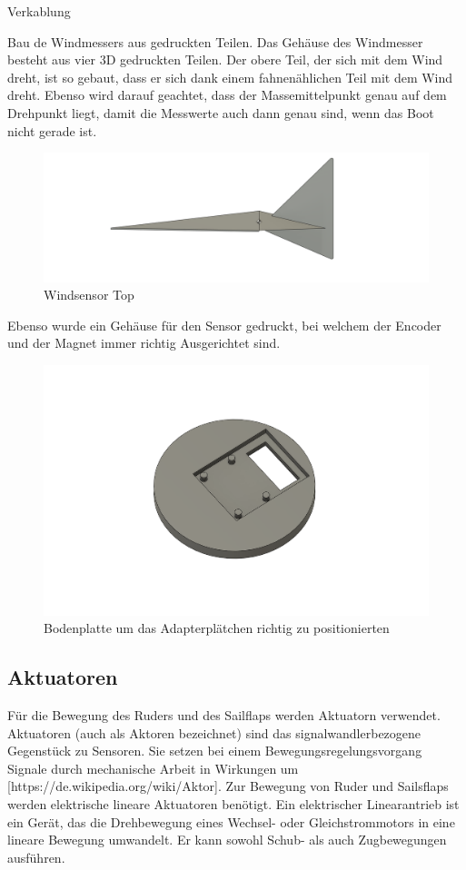 Verkablung

Bau de Windmessers aus gedruckten Teilen. 
Das Gehäuse des Windmesser besteht aus vier 3D gedruckten Teilen. Der obere Teil, der sich mit dem Wind dreht, ist so gebaut, dass er sich dank einem fahnenählichen Teil mit dem Wind dreht. Ebenso wird darauf geachtet, dass der Massemittelpunkt genau auf dem Drehpunkt liegt, damit die Messwerte auch dann genau sind, wenn das Boot nicht gerade ist. 

\begin{figure}[H]
    \centering
    \includegraphics[width=0.75\linewidth]{assets/windsensor_top.png}
    \caption{Windsensor Top}
    
\end{figure}

Ebenso wurde ein Gehäuse für den Sensor gedruckt, bei welchem der Encoder und der Magnet immer richtig Ausgerichtet sind.
\begin{figure}[H]
    \centering
    \includegraphics[width=0.5\linewidth]{assets/image.png}
    \caption{Bodenplatte um das Adapterplätchen richtig zu positionierten}
    
\end{figure}

\subsection{Aktuatoren}
Für die Bewegung des Ruders und des Sailflaps werden Aktuatorn verwendet. Aktuatoren (auch als Aktoren bezeichnet) sind das signalwandlerbezogene Gegenstück zu Sensoren. Sie setzen bei einem Bewegungsregelungsvorgang Signale durch mechanische Arbeit in Wirkungen um [https://de.wikipedia.org/wiki/Aktor]. Zur Bewegung von Ruder und Sailsflaps werden elektrische lineare Aktuatoren benötigt. Ein elektrischer Linearantrieb ist ein Gerät, das die Drehbewegung eines Wechsel- oder Gleichstrommotors in eine lineare Bewegung umwandelt. Er kann sowohl Schub- als auch Zugbewegungen ausführen.

